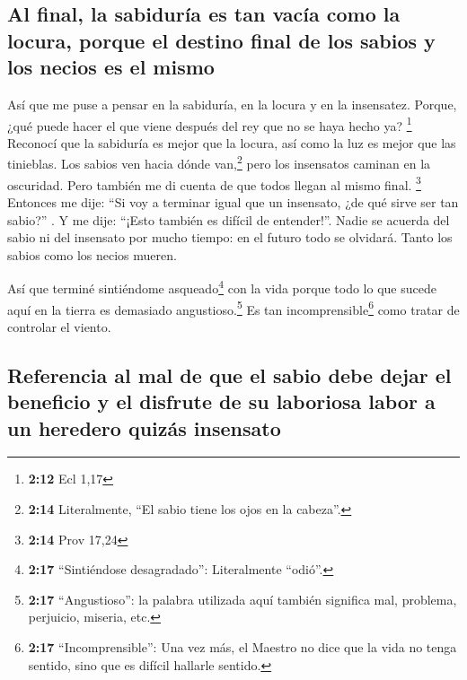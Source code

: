 \hypertarget{al-final-la-sabiduruxeda-es-tan-vacuxeda-como-la-locura-porque-el-destino-final-de-los-sabios-y-los-necios-es-el-mismo}{%
\subsection{Al final, la sabiduría es tan vacía como la locura, porque
el destino final de los sabios y los necios es el
mismo}\label{al-final-la-sabiduruxeda-es-tan-vacuxeda-como-la-locura-porque-el-destino-final-de-los-sabios-y-los-necios-es-el-mismo}}

 Así que me puse a pensar en la sabiduría, en la locura y
en la insensatez. Porque, ¿qué puede hacer el que viene después del rey
que no se haya hecho ya? \footnote{\textbf{2:12} Ecl 1,17}
 Reconocí que la sabiduría es mejor que la locura, así
como la luz es mejor que las tinieblas.  Los sabios ven
hacia dónde van,\footnote{\textbf{2:14} Literalmente, ``El sabio tiene
  los ojos en la cabeza''.} pero los insensatos caminan en la oscuridad.
Pero también me di cuenta de que todos llegan al mismo final.
\footnote{\textbf{2:14} Prov 17,24}  Entonces me dije:
``Si voy a terminar igual que un insensato, ¿de qué sirve ser tan
sabio?'' . Y me dije: ``¡Esto también es difícil de entender!''.
 Nadie se acuerda del sabio ni del insensato por mucho
tiempo: en el futuro todo se olvidará. Tanto los sabios como los necios
mueren.

 Así que terminé sintiéndome asqueado\footnote{\textbf{2:17}
  ``Sintiéndose desagradado'': Literalmente ``odió''.} con la vida
porque todo lo que sucede aquí en la tierra es demasiado
angustioso.\footnote{\textbf{2:17} ``Angustioso'': la palabra utilizada
  aquí también significa mal, problema, perjuicio, miseria, etc.} Es tan
incomprensible\footnote{\textbf{2:17} ``Incomprensible'': Una vez más,
  el Maestro no dice que la vida no tenga sentido, sino que es difícil
  hallarle sentido.} como tratar de controlar el viento.

\hypertarget{referencia-al-mal-de-que-el-sabio-debe-dejar-el-beneficio-y-el-disfrute-de-su-laboriosa-labor-a-un-heredero-quizuxe1s-insensato}{%
\subsection{Referencia al mal de que el sabio debe dejar el beneficio y
el disfrute de su laboriosa labor a un heredero quizás
insensato}\label{referencia-al-mal-de-que-el-sabio-debe-dejar-el-beneficio-y-el-disfrute-de-su-laboriosa-labor-a-un-heredero-quizuxe1s-insensato}}

